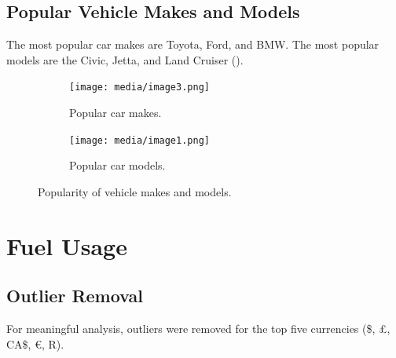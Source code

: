 \documentclass{article}
\begin{document}
\subsection{Popular Vehicle Makes and Models}
The most popular car makes are Toyota, Ford, and BMW. The most popular models are the Civic, Jetta, and Land Cruiser ().

\begin{figure}[htbp]
    \centering
    \begin{subfigure}[b]{0.45\textwidth}
        \centering
        \texttt{[image: media/image3.png]}
        \caption{Popular car makes.}
    \end{subfigure}
    \hfill
    \begin{subfigure}[b]{0.45\textwidth}
        \centering
        \texttt{[image: media/image1.png]}
        \caption{Popular car models.}
    \end{subfigure}
    \caption{Popularity of vehicle makes and models.}
    \label{fig:pop_models}
\end{figure}


\section{Fuel Usage}
\subsection{Outlier Removal}
For meaningful analysis, outliers were removed for the top five currencies (\$, £, CA\$, €, R).
\end{document}
